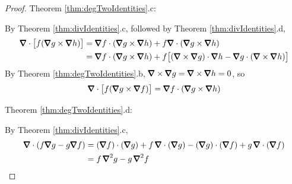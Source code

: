 \begin{proof}
\bigskip
\noindent Theorem \ref{thm:degTwoIdentities}.c:


By Theorem \ref{thm:divIdentities}.c, followed by 
Theorem \ref{thm:divIdentities}.d,
\begin{align*}
\vnabla\cdot\big[f(\vnabla g\times\vnabla h)\big]
&=\vnabla f\cdot(\vnabla g\times\vnabla h)
+f\vnabla\cdot(\vnabla g\times\vnabla h) \\
&=\vnabla f\cdot(\vnabla g\times\vnabla h)
+f\big[(\vnabla\times\vnabla g)\cdot\vnabla h-\vnabla g\cdot(\vnabla\times\vnabla h)\big]
\end{align*}
By Theorem \ref{thm:degTwoIdentities}.b, 
$\vnabla\times\vnabla g=\vnabla\times\vnabla h=0$, so 
\begin{equation*}
\vnabla\cdot\big[f(\vnabla g\times\vnabla f)\big]
               =\vnabla f\cdot(\vnabla g\times\vnabla h)
\end{equation*}

\bigskip
\noindent Theorem \ref{thm:degTwoIdentities}.d:

By Theorem \ref{thm:divIdentities}.c,
\begin{align*}
\vnabla\cdot(f\vnabla g-g\vnabla f)
&= (\vnabla f)\cdot(\vnabla g) +f\,\vnabla\cdot(\vnabla g)
   -(\vnabla g)\cdot(\vnabla f) +g\,\vnabla\cdot(\vnabla f) \\
&=f\,\vnabla^2g-g\,\vnabla^2f
\end{align*}



\end{proof}
